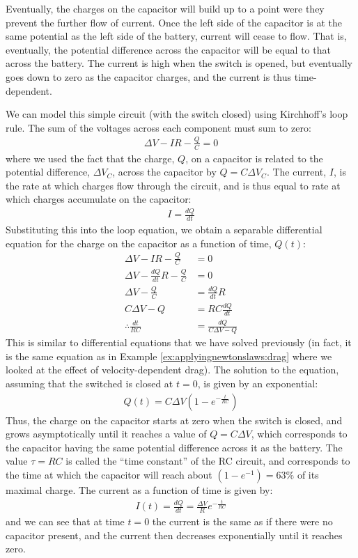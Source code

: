 Eventually, the charges on the capacitor will build up to a point were they prevent the further flow of current. Once the left side of the capacitor is at the same potential as the left side of the battery, current will cease to flow. That is, eventually, the potential difference across the capacitor will be equal to that across the battery. The current is high when the switch is opened, but eventually goes down to zero as the capacitor charges, and the current is thus time-dependent. 

We can model this simple circuit (with the switch closed) using Kirchhoff's loop rule. The sum of the voltages across each component must sum to zero:
\begin{align*}
\Delta V - IR - \frac{Q}{C} = 0
\end{align*}
where we used the fact that the charge, $Q$, on a capacitor is related to the potential difference, $\Delta V_C$, across the capacitor by $Q=C\Delta V_C$. The current, $I$, is the rate at which charges flow through the circuit, and is thus equal to rate at which charges accumulate on the capacitor:
\begin{align*}
I=\frac{dQ}{dt}
\end{align*}
Substituting this into the loop equation, we obtain a separable differential equation for the charge on the capacitor as a function of time, $Q(t)$:
\begin{align*}
\Delta V - IR - \frac{Q}{C} &= 0\\
\Delta V - \frac{dQ}{dt}R - \frac{Q}{C} &= 0\\
\Delta V - \frac{Q}{C} &= \frac{dQ}{dt}R\\
C\Delta V - Q &= RC\frac{dQ}{dt}\\
\therefore \frac{dt}{RC}&=\frac{dQ}{C\Delta V - Q }
\end{align*}
This is similar to differential equations that we have solved previously (in fact, it is the same equation as in Example \ref{ex:applyingnewtonslaws:drag} where we looked at the effect of velocity-dependent drag). The solution to the equation, assuming that the switched is closed at $t=0$, is given by an exponential:
\begin{align*}
Q(t) = C\Delta V\left( 1 - e^{-\frac{t}{RC}} \right)
\end{align*}
Thus, the charge on the capacitor starts at zero when the switch is closed, and grows asymptotically until it reaches a value of $Q=C\Delta V$, which corresponds to the capacitor having the same potential difference across it as the battery. The value $\tau=RC$ is called the ``time constant'' of the RC circuit, and corresponds to the time at which the capacitor will reach about $(1-e^{-1})=63\%$ of its maximal charge. The current as a function of time is given by:
\begin{align*}
I(t)=\frac{dQ}{dt}=\frac{\Delta V}{R}e^{-\frac{t}{RC}}
\end{align*}
and we can see that at time $t=0$ the current is the same as if there were no capacitor present, and the current then decreases exponentially until it reaches zero.
\newpage
